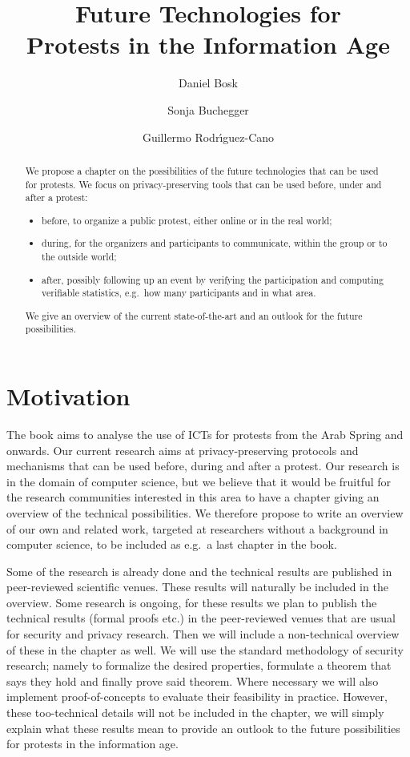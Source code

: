 \documentclass[a4paper]{llncs}
\title{%
  Future Technologies for\\
  Protests in the Information Age
}
\author{%
  Daniel Bosk
  \and
  Sonja Buchegger
  \and
  Guillermo Rodr\'{\i}guez-Cano
}
\institute{%
  Department of Theoretical Computer Science,\\
  School of Computer Science and Communication,\\
  KTH Royal Institute of Technology,
  Stockholm\\
  \email{\{dbosk,buc\}@kth.se}
}
\begin{document}
\maketitle

\begin{abstract}
  We propose a chapter on the possibilities of the future technologies that can 
  be used for protests.
  We focus on privacy-preserving tools that can be used before, under and after 
  a protest:
  \begin{itemize}
    \item before, to organize a public protest, either online or in the real 
      world;
    \item during, for the organizers and participants to communicate, within 
      the group or to the outside world;
    \item after, possibly following up an event by verifying the participation 
      and computing verifiable statistics, e.g.\ how many participants and in 
      what area.
  \end{itemize}
  We give an overview of the current state-of-the-art and an outlook for the 
  future possibilities.
\end{abstract}


\section{Motivation}
\label{Motivation}

The book aims to analyse the use of \acp{ICT} for protests from the Arab Spring 
and onwards.
Our current research aims at privacy-preserving protocols and mechanisms that 
can be used before, during and after a protest.
Our research is in the domain of computer science, but we believe that it would 
be fruitful for the research communities interested in this area to have 
a chapter giving an overview of the technical possibilities.
We therefore propose to write an overview of our own and related work, targeted 
at researchers without a background in computer science, to be included as 
e.g.\ a last chapter in the book.

Some of the research is already done and the technical results are published in 
peer-reviewed scientific venues.
These results will naturally be included in the overview.
Some research is ongoing, for these results we plan to publish the technical 
results (formal proofs etc.) in the peer-reviewed venues that are usual for 
security and privacy research.
Then we will include a non-technical overview of these in the chapter as well.
We will use the standard methodology of security research; namely to formalize 
the desired properties, formulate a theorem that says they hold and finally 
prove said theorem.
Where necessary we will also implement proof-of-concepts to evaluate their 
feasibility in practice.
However, these too-technical details will not be included in the chapter, we 
will simply explain what these results mean to provide an outlook to the future 
possibilities for protests in the information age.
\end{document}
